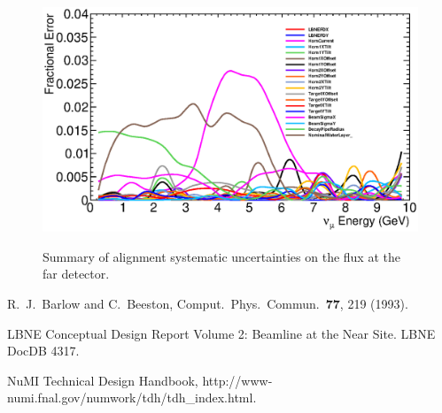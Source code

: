 \begin{figure}[ht]
  \begin{center}
    {\includegraphics[width=6.0in]{figures/error_summary_far.eps}}
  \end{center}
\caption{ Summary of alignment systematic uncertainties on the flux at the far detector.}
\end{figure}



\begin{thebibliography}{1}

  R.~J.~Barlow and C.~Beeston,
  Comput.\ Phys.\ Commun.\  {\bf 77}, 219 (1993).

LBNE Conceptual Design Report Volume 2: Beamline at the Near Site.  LBNE DocDB 4317.

NuMI Technical Design Handbook, http://www-numi.fnal.gov/numwork/tdh/tdh\_index.html.
  
\end{thebibliography}




























